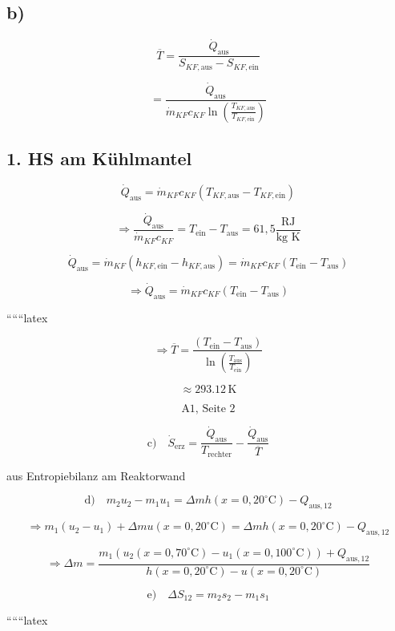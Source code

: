 

\subsection*{b)}

\[
\overline{T} = \frac{\dot{Q}_{\text{aus}}}{S_{KF,\text{aus}} - S_{KF,\text{ein}}}
\]

\[
= \frac{\dot{Q}_{\text{aus}}}{\dot{m}_{KF} c_{KF} \ln \left( \frac{T_{KF,\text{aus}}}{T_{KF,\text{ein}}} \right)}
\]

\subsection*{1. HS am Kühlmantel}

\[
\dot{Q}_{\text{aus}} = \dot{m}_{KF} c_{KF} (T_{KF,\text{aus}} - T_{KF,\text{ein}})
\]

\[
\Rightarrow \frac{\dot{Q}_{\text{aus}}}{\dot{m}_{KF} c_{KF}} = T_{\text{ein}} - T_{\text{aus}} = 61{,}5 \frac{\text{RJ}}{\text{kg K}}
\]

\[
\dot{Q}_{\text{aus}} = \dot{m}_{KF} (h_{KF,\text{ein}} - h_{KF,\text{aus}}) = \dot{m}_{KF} c_{KF} (T_{\text{ein}} - T_{\text{aus}})
\]

\[
\Rightarrow \dot{Q}_{\text{aus}} = \dot{m}_{KF} c_{KF} (T_{\text{ein}} - T_{\text{aus}})
\]

``````latex


\[
\Rightarrow \overline{T} = \frac{(T_{\text{ein}} - T_{\text{aus}})}{\ln \left( \frac{T_{\text{aus}}}{T_{\text{ein}}} \right)}
\]

\[
\approx 293.12 \, \text{K}
\]

\[
\boxed{\text{A1, Seite 2}}
\]

\[
\text{c)} \quad \dot{S}_{\text{erz}} = \frac{\dot{Q}_{\text{aus}}}{T_{\text{rechter}}} - \frac{\dot{Q}_{\text{aus}}}{\overline{T}}
\]

aus Entropiebilanz am Reaktorwand

\[
\text{d)} \quad m_2 u_2 - m_1 u_1 = \Delta m h(x=0, 20^\circ \text{C}) - Q_{\text{aus}, 12}
\]

\[
\Rightarrow m_1 (u_2 - u_1) + \Delta m u(x=0, 20^\circ \text{C}) = \Delta m h(x=0, 20^\circ \text{C}) - Q_{\text{aus}, 12}
\]

\[
\Rightarrow \Delta m = \frac{m_1 \left( u_2 (x=0, 70^\circ \text{C}) - u_1 (x=0, 100^\circ \text{C}) \right) + Q_{\text{aus}, 12}}{h(x=0, 20^\circ \text{C}) - u(x=0, 20^\circ \text{C})}
\]

\[
\text{e)} \quad \Delta S_{12} = m_2 s_2 - m_1 s_1
\]

``````latex